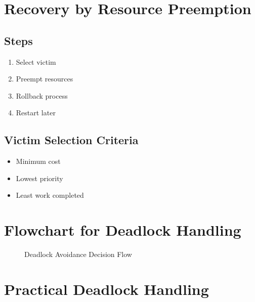 \section{Recovery by Resource Preemption}

\subsection{Steps}

\begin{enumerate}
\item Select victim
\item Preempt resources
\item Rollback process
\item Restart later
\end{enumerate}

\subsection{Victim Selection Criteria}

\begin{itemize}
\item Minimum cost
\item Lowest priority
\item Least work completed
\end{itemize}

\section{Flowchart for Deadlock Handling}

\begin{figure}[H]
\centering
{}
\caption{Deadlock Avoidance Decision Flow}
\end{figure}

\section{Practical Deadlock Handling}

